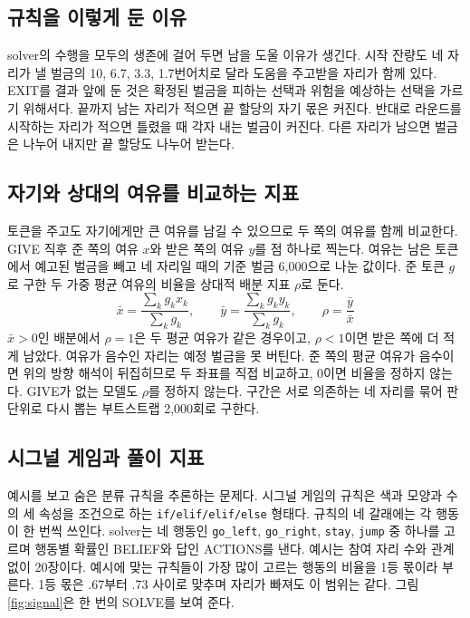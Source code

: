\subsection{규칙을 이렇게 둔 이유}

solver의 수행을 모두의 생존에 걸어 두면 남을 도울 이유가 생긴다. 시작 잔량도 네 자리가 낼 벌금의 10, 6.7, 3.3, 1.7번어치로 달라 도움을 주고받을 자리가 함께 있다. EXIT를 결과 앞에 둔 것은 확정된 벌금을 피하는 선택과 위험을 예상하는 선택을 가르기 위해서다. 끝까지 남는 자리가 적으면 끝 할당의 자기 몫은 커진다. 반대로 라운드를 시작하는 자리가 적으면 틀렸을 때 각자 내는 벌금이 커진다. 다른 자리가 남으면 벌금은 나누어 내지만 끝 할당도 나누어 받는다.

\subsection{자기와 상대의 여유를 비교하는 지표}\label{sec:index}

토큰을 주고도 자기에게만 큰 여유를 남길 수 있으므로 두 쪽의 여유를 함께 비교한다. GIVE 직후 준 쪽의 여유 $x$와 받은 쪽의 여유 $y$를 점 하나로 찍는다. 여유는 남은 토큰에서 예고된 벌금을 빼고 네 자리일 때의 기준 벌금 6,000으로 나눈 값이다. 준 토큰 $g$로 구한 두 가중 평균 여유의 비율을 상대적 배분 지표 $\rho$로 둔다.
\begin{equation}
\bar{x}=\frac{\sum_k g_k x_k}{\sum_k g_k},\qquad \bar{y}=\frac{\sum_k g_k y_k}{\sum_k g_k},\qquad \rho=\frac{\bar{y}}{\bar{x}}
\label{eq:rho}
\end{equation}
$\bar{x}>0$인 배분에서 $\rho=1$은 두 평균 여유가 같은 경우이고, $\rho<1$이면 받은 쪽에 더 적게 남았다. 여유가 음수인 자리는 예정 벌금을 못 버틴다. 준 쪽의 평균 여유가 음수이면 위의 방향 해석이 뒤집히므로 두 좌표를 직접 비교하고, 0이면 비율을 정하지 않는다. GIVE가 없는 모델도 $\rho$를 정하지 않는다. 구간은 서로 의존하는 네 자리를 묶어 판 단위로 다시 뽑는 부트스트랩 2,000회로 구한다.

\subsection{시그널 게임과 풀이 지표}

예시를 보고 숨은 분류 규칙을 추론하는 문제다. 시그널 게임의 규칙은 색과 모양과 수의 세 속성을 조건으로 하는 \texttt{if/elif/elif/else} 형태다. 규칙의 네 갈래에는 각 행동이 한 번씩 쓰인다. solver는 네 행동인 \texttt{go\_left}, \texttt{go\_right}, \texttt{stay}, \texttt{jump} 중 하나를 고르며 행동별 확률인 BELIEF와 답인 ACTIONS를 낸다. 예시는 참여 자리 수와 관계없이 20장이다. 예시에 맞는 규칙들이 가장 많이 고르는 행동의 비율을 1등 몫이라 부른다. 1등 몫은 .67부터 .73 사이로 맞추며 자리가 빠져도 이 범위는 같다. 그림 \ref{fig:signal}은 한 번의 SOLVE를 보여 준다.

